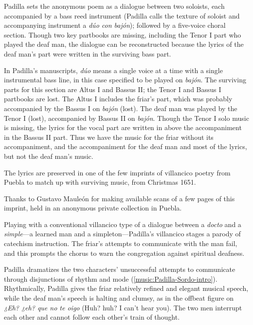 Padilla sets the anonymous poem as a dialogue between two soloists, each
accompanied by a bass reed instrument (Padilla calls the texture of soloist and
accompanying instrument a \emph{dúo con bajón}); followed by a five-voice choral
section.
Though two key partbooks are missing, including the Tenor I part who played the
deaf man, the dialogue can be reconstructed because the lyrics of the deaf man's
part were written in the surviving bass part.%
\begin{Footnote}
    In Padilla's manuscripts, \emph{dúo} means a single voice at a time with a
    single instrumental bass line, in this case specified to be played on
    \emph{bajón}.  
    The surviving parts for this section are Altus I and Bassus II; the Tenor I
    and Bassus I partbooks are lost.
    The Altus I includes the friar's part, which was probably accompanied by the
    Bassus I on \emph{bajón} (lost).  
    The deaf man was played by the Tenor I (lost), accompanied by Bassus II on
    \emph{bajón}.
    Though the Tenor I solo music is missing, the lyrics for the vocal part are
    written in above the accompaniment in the Bassus II part.  
    Thus we have the music for the friar without its accompaniment, and the
    accompaniment for the deaf man and most of the lyrics, but not the deaf
    man's music.
\end{Footnote}
The lyrics are preserved in one of the few imprints of villancico poetry from
Puebla to match up with surviving music, from Christmas 1651.%
\begin{Footnote}
    Thanks to Gustavo Mauleón for making available scans of a few pages of this
    imprint, held in an anonymous private collection in Puebla.
\end{Footnote}

Playing with a conventional villancico type of a dialogue between a \emph{docto}
and a \emph{simple}---a learned man and a simpleton---Padilla's villancico
stages a parody of catechism instruction.
The friar's attempts to communicate with the  man fail, and this
prompts the chorus to warn the congregation against spiritual deafness.

Padilla dramatizes the two characters' unsuccessful attempts to communicate
through disjunctions of rhythm and mode  (\cref{music:Padilla-Sordo-intro}).
Rhythmically, Padilla gives the friar relatively refined and elegant musical
speech, while the deaf man's speech is halting and clumsy, as in the offbeat
figure on \emph{¿Eh? ¿eh? que no te oigo} (Huh? huh? I can't hear you).
The two men interrupt each other and cannot follow each other's train of
thought.

